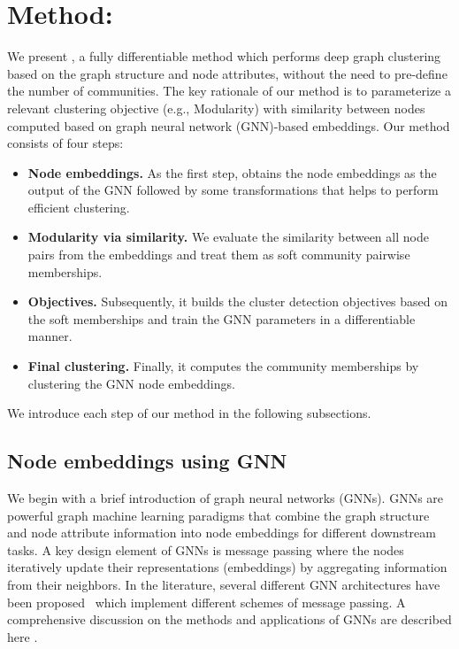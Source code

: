 \section{Method: \model}


We present \model, a fully differentiable method which performs deep graph clustering based on the graph structure and node attributes, without the need to pre-define the number of communities.
The key rationale of our method is to parameterize a relevant clustering objective (e.g., Modularity) with similarity between nodes computed based on graph neural network (GNN)-based embeddings. Our method {\model} consists of four steps:
\begin{itemize}
    \item \textbf{Node embeddings. }As the first step, {\model} obtains the node embeddings as the output of the GNN followed by some transformations that helps to perform efficient clustering.
    \item 
    \textbf{Modularity via similarity. }We evaluate the similarity between all node pairs from the embeddings and treat them as soft community pairwise memberships.%
    \item \textbf{Objectives. }Subsequently, it builds the cluster detection objectives based on the soft memberships and train the GNN parameters in a differentiable manner.%
    \item \textbf{Final clustering. } Finally, it computes the community memberships by clustering the GNN node embeddings.%
\end{itemize}




We introduce each step of our method {\model} in the following subsections. 

{\subsection{Node embeddings using GNN}\label{subsec::node_embedding}} 

We begin with a brief introduction of graph neural networks (GNNs). GNNs are powerful graph machine learning paradigms that combine the graph structure and node attribute information into node embeddings for different downstream tasks. %
A key design element of GNNs is message passing where the nodes iteratively update their representations (embeddings) by aggregating information from their neighbors. In the literature, several different GNN architectures have been proposed~\cite{scarselli2008graph, kipf2016semi, hamilton2017inductive, velickovic2017graph} which implement different schemes of message passing. A comprehensive discussion on the methods and applications of GNNs are described here \cite{zhou2020graph}.

